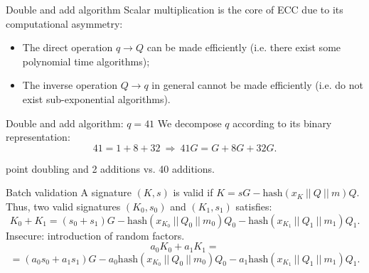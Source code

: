 \documentclass[slidescentered]{beamer}
\begin{document}
	\begin{frame}[label = double_add]{Double and add algorithm}
		Scalar multiplication is the core of ECC due to its computational asymmetry:
		\begin{itemize}
			\item The direct operation $q \to Q$ can be made efficiently (i.e. there exist some polynomial time algorithms);
			\item The inverse operation $Q \to q$ in general cannot be made efficiently (i.e. do not exist sub-exponential algorithms).
		\end{itemize}
	
		\bigskip
		\noindent
			
		\begin{block}{Double and add algorithm: $q = 41$}
			We decompose $q$ according to its binary representation:
			$$41 = 1 + 8 + 32  \ \Longrightarrow \ 41G = G + 8G + 32G.$$
			
			 point doubling and 2 additions vs. 40 additions.
	\end{block}
	\end{frame}

	\begin{frame}[label = batch_validation]{Batch validation}
		A signature $(K, s)$ is valid if $K = sG - \text{hash}(x_K \ || \ Q \ || \ m)Q$. Thus, two valid signatures $(K_0, s_0)$ and $(K_1, s_1)$ satisfies:
		$$K_0 + K_1 = (s_0 + s_1)G - \text{hash}(x_{K_0} \ || \ Q_0 \ || \ m_0)Q_0 - \text{hash}(x_{K_1} \ || \ Q_1 \ || \ m_1)Q_1.$$
		Insecure: introduction of random factors.
		$$a_0K_0 + a_1K_1 =$$ $$
		= (a_0s_0 + a_1s_1)G - a_0\text{hash}(x_{K_0} \ || \ Q_0 \ || \ m_0)Q_0 - a_1\text{hash}(x_{K_1} \ || \ Q_1 \ || \ m_1)Q_1.$$
	\end{frame}
\end{document}
